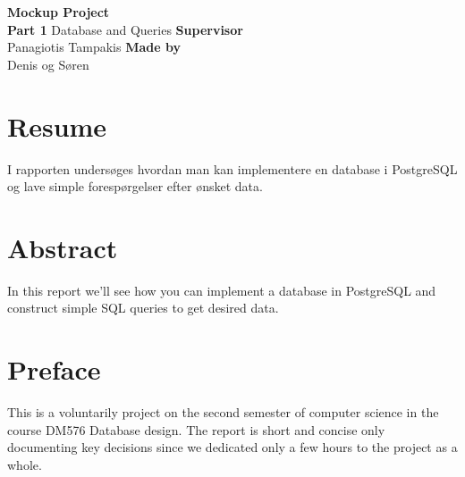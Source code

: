 \documentclass{article}
\begin{document}
\begin{titlepage}
    \vfill
    \clearpage\thispagestyle{empty}
    \centering
    {\Large \textbf{Mockup Project} }\vspace{0.5cm} \\
    {\textbf{Part 1} Database and Queries}
    \vfill
    {\textbf{Supervisor}}\\
    {Panagiotis Tampakis}
    \vfill
    {\textbf{Made by}}\\
    {Denis og Søren\\}
    \vskip6cm
\end{titlepage}

\section*{Resume}
I rapporten undersøges hvordan man kan implementere en database i PostgreSQL og 
lave simple forespørgelser efter ønsket data.

\section*{Abstract}
In this report we'll see how you can implement a database in PostgreSQL and
construct simple SQL queries to get desired data.


\newpage
\section*{Preface}
This is a voluntarily project on the second semester of computer science in the course DM576 Database design.
The report is short and concise only documenting key decisions since we dedicated only a few hours to
the project as a whole.

\clearpage
\tableofcontents
\newpage



\newpage


\newpage


% 

% 
\end{document}
